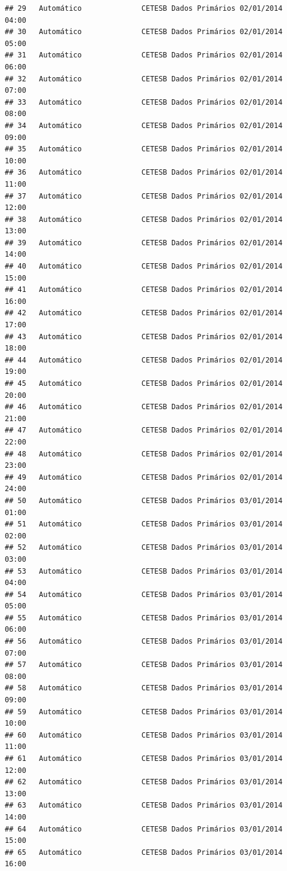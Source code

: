 \documentclass[]{book}
\begin{document}
\begin{verbatim}
## 29   Automático              CETESB Dados Primários 02/01/2014 04:00
## 30   Automático              CETESB Dados Primários 02/01/2014 05:00
## 31   Automático              CETESB Dados Primários 02/01/2014 06:00
## 32   Automático              CETESB Dados Primários 02/01/2014 07:00
## 33   Automático              CETESB Dados Primários 02/01/2014 08:00
## 34   Automático              CETESB Dados Primários 02/01/2014 09:00
## 35   Automático              CETESB Dados Primários 02/01/2014 10:00
## 36   Automático              CETESB Dados Primários 02/01/2014 11:00
## 37   Automático              CETESB Dados Primários 02/01/2014 12:00
## 38   Automático              CETESB Dados Primários 02/01/2014 13:00
## 39   Automático              CETESB Dados Primários 02/01/2014 14:00
## 40   Automático              CETESB Dados Primários 02/01/2014 15:00
## 41   Automático              CETESB Dados Primários 02/01/2014 16:00
## 42   Automático              CETESB Dados Primários 02/01/2014 17:00
## 43   Automático              CETESB Dados Primários 02/01/2014 18:00
## 44   Automático              CETESB Dados Primários 02/01/2014 19:00
## 45   Automático              CETESB Dados Primários 02/01/2014 20:00
## 46   Automático              CETESB Dados Primários 02/01/2014 21:00
## 47   Automático              CETESB Dados Primários 02/01/2014 22:00
## 48   Automático              CETESB Dados Primários 02/01/2014 23:00
## 49   Automático              CETESB Dados Primários 02/01/2014 24:00
## 50   Automático              CETESB Dados Primários 03/01/2014 01:00
## 51   Automático              CETESB Dados Primários 03/01/2014 02:00
## 52   Automático              CETESB Dados Primários 03/01/2014 03:00
## 53   Automático              CETESB Dados Primários 03/01/2014 04:00
## 54   Automático              CETESB Dados Primários 03/01/2014 05:00
## 55   Automático              CETESB Dados Primários 03/01/2014 06:00
## 56   Automático              CETESB Dados Primários 03/01/2014 07:00
## 57   Automático              CETESB Dados Primários 03/01/2014 08:00
## 58   Automático              CETESB Dados Primários 03/01/2014 09:00
## 59   Automático              CETESB Dados Primários 03/01/2014 10:00
## 60   Automático              CETESB Dados Primários 03/01/2014 11:00
## 61   Automático              CETESB Dados Primários 03/01/2014 12:00
## 62   Automático              CETESB Dados Primários 03/01/2014 13:00
## 63   Automático              CETESB Dados Primários 03/01/2014 14:00
## 64   Automático              CETESB Dados Primários 03/01/2014 15:00
## 65   Automático              CETESB Dados Primários 03/01/2014 16:00

\end{verbatim}
\end{document}
